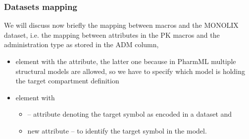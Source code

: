 

\subsubsection{Datasets mapping}
We will discuss now briefly the mapping between macros and the MONOLIX dataset, 
i.e. the mapping between  attributes in the PK macros and the 
administration type as stored in the ADM column,
\begin{itemize}
\item 
{} element with the  attribute, the latter one because 
in PharmML multiple structural models are allowed, so we have to specify which model is 
holding the target compartment definition
\item
{} element with
\begin{itemize}
\item 
{} -- attribute denoting the target symbol as encoded in a dataset and
\item 
new attribute  -- to identify the target symbol in the model.
\end{itemize}
\end{itemize}


